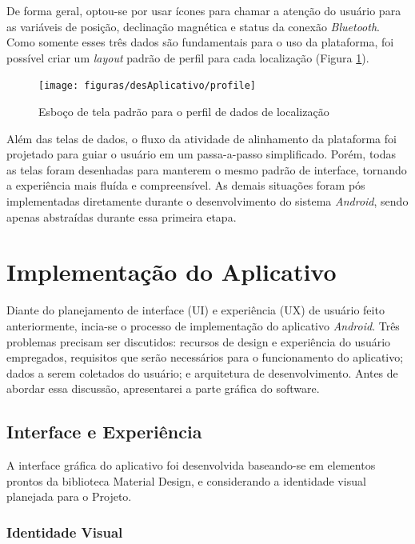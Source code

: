 De forma geral, optou-se por usar ícones para chamar a atenção do usuário para as variáveis de posição, declinação magnética e status da conexão \textit{Bluetooth}. Como somente esses três dados são fundamentais para o uso da plataforma, foi possível criar um \textit{layout} padrão de perfil para cada localização (Figura \ref{fig:layoutpadraoperfil}). 

\begin{figure}[!htb]
	\centering
	\caption{Esboço de tela padrão para o perfil de dados de localização}
	\texttt{[image: figuras/desAplicativo/profile]}
	\label{fig:layoutpadraoperfil}
\end{figure}

Além das telas de dados, o fluxo da atividade de alinhamento da plataforma foi projetado para guiar o usuário em um passa-a-passo simplificado. Porém, todas as telas foram desenhadas para manterem o mesmo padrão de interface, tornando a experiência mais fluída e compreensível. As demais situações foram pós implementadas diretamente durante o desenvolvimento do sistema \textit{Android}, sendo apenas abstraídas durante essa primeira etapa.

\section{Implementação do Aplicativo}

Diante do planejamento de interface (UI) e experiência (UX) de usuário feito anteriormente, incia-se o processo de implementação do aplicativo \textit{Android}. Três problemas precisam ser discutidos: recursos de design e experiência do usuário empregados, requisitos que serão necessários para o funcionamento do aplicativo; dados a serem coletados do usuário; e arquitetura de desenvolvimento. Antes de abordar essa discussão, apresentarei a parte gráfica do software.

\subsection{Interface e Experiência}

A interface gráfica do aplicativo foi desenvolvida baseando-se em elementos prontos da biblioteca Material Design, e considerando a identidade visual planejada para o Projeto.

\subsubsection{Identidade Visual}


